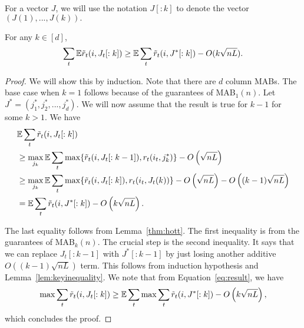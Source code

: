 For a vector $J$, we will use the notation $J[:k]$ to denote the vector $(J(1),...,J(k)).$
\begin{lemma}
\label{lem:keylem}
For any $k \in [d]$,
$$ \sum_t \mathbb{E} \tilde{r}_t(i, J_t[:k]) \geq  \mathbb{E} \sum_t \tilde{r}_t(i, J^*[:k]) - O(k\sqrt{nL}).$$ 
\end{lemma}
\begin{proof}
We will show this by induction. Note that there are $d$ column MABs. The base case when $k=1$ follows because of the guarantees of MAB$_1(n)$.
Let $J^* = (j_1^*,j_2^*,...,j_d^*).$   We will now assume that the result is true for $k-1$ for some $k>1.$
We have 
\begin{align}
& \mathbb{E}  \sum_t \tilde{r}_t(i, J_t[:k])   \\
&\geq \max_{j_k} \mathbb{E} \sum_t   \max \{ \tilde{r}_t(i, J_t[:k-1]), r_t(i_t,j^*_k) \}  - O\left(\sqrt{nL}\right) \\
&\geq \max_{j_k} \mathbb{E} \sum_t   \max \{  \tilde{r}_t(i, J_t[:k]), r_t(i_t,J_t(k)) \}   - O\left( \sqrt{nL} \right) - O\left( (k-1)\sqrt{nL} \right)   \\
\label{eq:result}
& =  \mathbb{E} \sum_t  \tilde{r}_t(i, J^*[:k])  - O\left( k\sqrt{nL} \right).
\end{align}

The last equality follows from Lemma~\ref{thm:hott}.  
The first inequality is from the guarantees of MAB$_k(n)$.  The crucial step is  the second inequality. It says that we can replace $J_t[:k-1]$ with $J^*[:k-1]$ by just losing another additive $O\left( (k-1) \sqrt{nL} \right)$ term. This follows from induction hypothesis and Lemma~\ref{lem:keyinequality}. We note that from Equation~\ref{eq:result}, we have
$$ \max  \sum_t \tilde{r}_t(i, J_t[:k])  \geq  \mathbb{E} \sum_t \max  \sum_t \tilde{r}_t(i, J^*[:k])  - O\left( k \sqrt{nL} \right),$$
which concludes the proof.
\end{proof}


